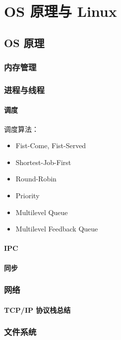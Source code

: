 \chapter{OS 原理与 Linux}

\section{OS 原理}

\subsection{内存管理}

\subsection{进程与线程}

\subsubsection{调度}

调度算法：
\begin{itemize}
  \item Fist-Come, Fist-Served
  \item Shortest-Job-First
  \item Round-Robin
  \item Priority
  \item Multilevel Queue
  \item Multilevel Feedback Queue
\end{itemize}

\subsubsection{IPC}

\subsubsection{同步}

\subsection{网络}
\subsubsection{TCP/IP 协议栈总结}

\subsection{文件系统}

